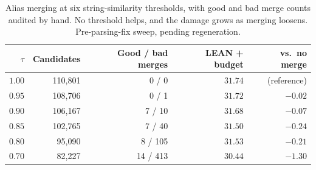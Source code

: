 \documentclass[11pt]{article}
\begin{document}
\begin{table}[t]
  \caption{Alias merging at six string-similarity thresholds, with good and bad merge counts audited by hand. No threshold helps, and the damage grows as merging loosens. Pre-parsing-fix sweep, pending regeneration.}
  \label{tab:alias}
  \centering
  \begin{tabular}{rrrrr}
    \toprule
    $\tau$ & Candidates & Good / bad merges & LEAN + budget & vs.\ no merge \\
    \midrule
    $1.00$ & 110,801 & 0 / 0     & $31.74$ & (reference) \\
    $0.95$ & 108,706 & 0 / 1     & $31.72$ & $-0.02$ \\
    $0.90$ & 106,167 & 7 / 10    & $31.68$ & $-0.07$ \\
    $0.85$ & 102,765 & 7 / 40    & $31.50$ & $-0.24$ \\
    $0.80$ &  95,090 & 8 / 105   & $31.53$ & $-0.21$ \\
    $0.70$ &  82,227 & 14 / 413  & $30.44$ & $-1.30$ \\
    \bottomrule
  \end{tabular}
\end{table}
\end{document}
